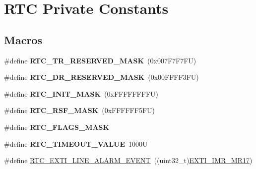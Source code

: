 \hypertarget{group___r_t_c___private___constants}{}\section{R\+TC Private Constants}
\label{group___r_t_c___private___constants}
\subsection*{Macros}
\begin{DoxyCompactItemize}
\item 
\mbox{\label{group___r_t_c___private___constants_gacc08d7d212e235f4b04bb88f5567fa54}} 
\#define {\bfseries R\+T\+C\+\_\+\+T\+R\+\_\+\+R\+E\+S\+E\+R\+V\+E\+D\+\_\+\+M\+A\+SK}~(0x007\+F7\+F7\+F\+U)
\item 
\mbox{\label{group___r_t_c___private___constants_ga16855eaae542f992c93170492822d058}} 
\#define {\bfseries R\+T\+C\+\_\+\+D\+R\+\_\+\+R\+E\+S\+E\+R\+V\+E\+D\+\_\+\+M\+A\+SK}~(0x00\+F\+F\+F\+F3\+F\+U)
\item 
\mbox{\label{group___r_t_c___private___constants_ga0dbaf639bc171f2055c9055d538f13df}} 
\#define {\bfseries R\+T\+C\+\_\+\+I\+N\+I\+T\+\_\+\+M\+A\+SK}~(0x\+F\+F\+F\+F\+F\+F\+F\+F\+U)
\item 
\mbox{\label{group___r_t_c___private___constants_ga3a1033490aaf8304e1522d551bd1a7b9}} 
\#define {\bfseries R\+T\+C\+\_\+\+R\+S\+F\+\_\+\+M\+A\+SK}~(0x\+F\+F\+F\+F\+F\+F5\+F\+U)
\item 
\#define {\bfseries R\+T\+C\+\_\+\+F\+L\+A\+G\+S\+\_\+\+M\+A\+SK}
\item 
\mbox{\label{group___r_t_c___private___constants_gaca17c243759056a49a411f6324dd6123}} 
\#define {\bfseries R\+T\+C\+\_\+\+T\+I\+M\+E\+O\+U\+T\+\_\+\+V\+A\+L\+UE}~1000U
\item 
\#define \hyperlink{group___r_t_c___private___constants_gaeffe9b89372b06df1c0eff2f4346682b}{R\+T\+C\+\_\+\+E\+X\+T\+I\+\_\+\+L\+I\+N\+E\+\_\+\+A\+L\+A\+R\+M\+\_\+\+E\+V\+E\+NT}~((uint32\+\_\+t)\hyperlink{group___peripheral___registers___bits___definition_ga4489fa85d1552b8f40faed93483a5d35}{E\+X\+T\+I\+\_\+\+I\+M\+R\+\_\+\+M\+R17})
\end{DoxyCompactItemize}


